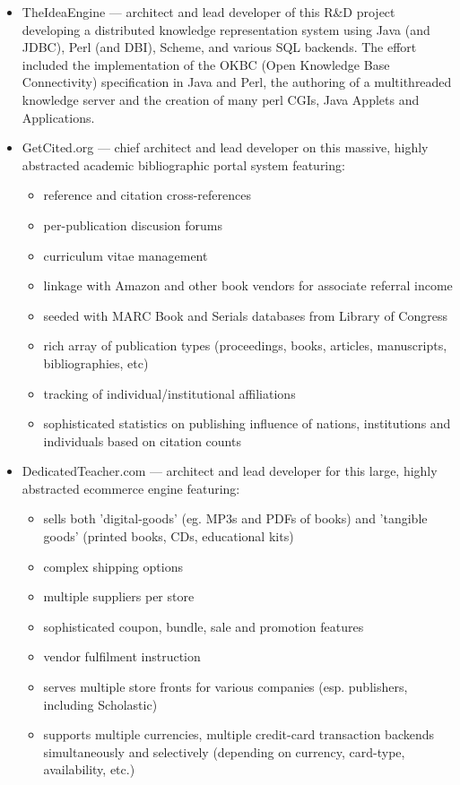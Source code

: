\begin{resume}
\begin{position}
\begin{itemize}

\item TheIdeaEngine --- architect and lead developer of this R\&D project 
  developing a distributed knowledge representation system using 
  Java (and JDBC), Perl (and DBI), Scheme, and various SQL backends.  
  The effort included the
  implementation of the OKBC (Open Knowledge Base Connectivity)
  specification in Java and Perl,
  the authoring of a multithreaded knowledge server
  and the creation of many perl CGIs, Java Applets and Applications.

\item GetCited.org --- chief architect and lead developer on
  this massive, highly abstracted academic bibliographic portal system featuring:
  \begin{itemize}
    \item reference and citation cross-references
    \item per-publication discusion forums
    \item curriculum vitae management
    \item linkage with Amazon and other book vendors for associate
    referral income
    \item seeded with MARC Book and Serials databases from Library of Congress
    \item rich array of publication types (proceedings, books, articles,
       manuscripts, bibliographies, etc)
    \item tracking of individual/institutional affiliations
    \item sophisticated statistics on publishing influence of
       nations, institutions and individuals based on citation counts
  \end{itemize}    

\item DedicatedTeacher.com --- architect and lead developer
  for this large, highly abstracted ecommerce engine featuring:
    \begin{itemize}
      \item sells both 'digital-goods' (eg. MP3s and PDFs of books)
      and 'tangible goods' (printed books, CDs, educational kits)
      \item complex shipping options
      \item multiple suppliers per store
      \item sophisticated coupon, bundle, sale and promotion features
      \item vendor fulfilment instruction
      \item serves multiple store fronts for various companies
      (esp. publishers, including Scholastic)
      \item supports multiple currencies, multiple credit-card
      transaction backends simultaneously and selectively 
      (depending on currency, card-type, availability, etc.)
    \end{itemize}


\end{itemize}
\end{position}
\end{resume}
